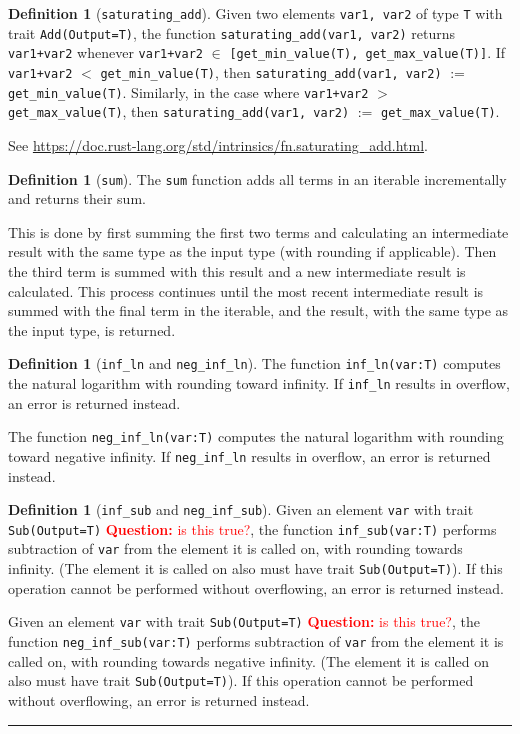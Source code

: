 \documentclass[11pt,a4paper]{article}
\theoremstyle{definition}
\newtheorem{definition}[theorem]{Definition}
\newcommand{\horizline}{\noindent\rule{\textwidth}{1pt}}
\newcommand{\inRust}[2]{See \url{#2}.}
\newcommand{\questionc}[1]{\textcolor{red}{\textbf{Question:} #1}}
\begin{document}
\begin{definition}[\texttt{saturating\_add}]
    \label{defn:fn-saturating-add}
    Given two elements \texttt{var1, var2} of type \texttt{T} with trait \texttt{Add(Output=T)}, the function  \texttt{saturating\_add(var1, var2)} returns \texttt{var1+var2} whenever \texttt{var1+var2} $\in$ \texttt{[get\_min\_value(T), get\_max\_value(T)]}. If \texttt{var1+var2} $<$ \texttt{get\_min\_value(T)}, then \texttt{saturating\_add(var1, var2)} $:=$ \texttt{get\_min\_value(T)}. Similarly, in the case where \texttt{var1+var2} $>$ \texttt{get\_max\_value(T)}, then \texttt{saturating\_add(var1, var2)} $:=$ \texttt{get\_max\_value(T)}. 
    
    \inRust{std::intrinsics::saturating\_add}{https://doc.rust-lang.org/std/intrinsics/fn.saturating_add.html}
\end{definition}
\begin{definition}[\texttt{sum}]
    The \texttt{sum} function adds all terms in an iterable incrementally and returns their sum.
    
    This is done by first summing the first two terms and calculating an intermediate result with the same type as the input type (with rounding if applicable). Then the third term is summed with this result and a new intermediate result is calculated. This process continues until the most recent intermediate result is summed with the final term in the iterable, and the result, with the same type as the input type, is returned.
\end{definition}

\begin{definition}[\texttt{inf\_ln} and \texttt{neg\_inf\_ln}]
\label{defn:fn-inf-ln}
The function \texttt{inf\_ln(var:T)} computes the natural logarithm with rounding toward infinity. If \texttt{inf\_ln} results in overflow, an error is returned instead.

The function \texttt{neg\_inf\_ln(var:T)} computes the natural logarithm with rounding toward negative infinity. If \texttt{neg\_inf\_ln} results in overflow, an error is returned instead.
\end{definition}

\begin{definition}[\texttt{inf\_sub} and \texttt{neg\_inf\_sub}]
\label{defn:fn-inf-sub}
Given an element \texttt{var} with trait \texttt{Sub(Output=T)} \questionc{is this true?}, the function \texttt{inf\_sub(var:T)} performs subtraction of \texttt{var} from the element it is called on, with rounding towards infinity. (The element it is called on also must have trait \texttt{Sub(Output=T)}). If this operation cannot be performed without overflowing, an error is returned instead. 

Given an element \texttt{var} with trait \texttt{Sub(Output=T)} \questionc{is this true?}, the function \texttt{neg\_inf\_sub(var:T)} performs subtraction of \texttt{var} from the element it is called on, with rounding towards negative infinity. (The element it is called on also must have trait \texttt{Sub(Output=T)}). If this operation cannot be performed without overflowing, an error is returned instead. 
\end{definition}
\horizline
\end{document}

